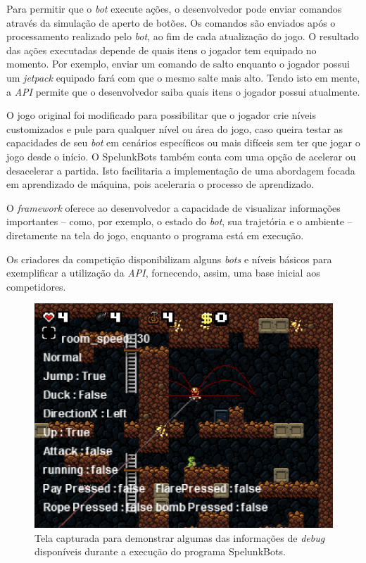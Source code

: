 Para permitir que o \textit{bot} execute ações, o desenvolvedor pode enviar
comandos através da simulação de aperto de botões. Os comandos são enviados
após o processamento realizado pelo \textit{bot}, ao fim de cada atualização do
jogo. O resultado das ações executadas depende de quais itens o jogador tem
equipado no momento. Por exemplo, enviar um comando de salto enquanto o jogador
possui um \textit{jetpack} equipado fará com que o mesmo salte mais alto. Tendo
isto em mente, a \textit{API} permite que o desenvolvedor saiba quais itens o
jogador possui atualmente.

O jogo original foi modificado para possibilitar que o jogador crie níveis
customizados e pule para qualquer nível ou área do jogo, caso queira testar as
capacidades de seu \textit{bot} em cenários específicos ou mais difíceis sem
ter que jogar o jogo desde o início. O SpelunkBots também conta com uma opção
de acelerar ou desacelerar a partida. Isto facilitaria a implementação de uma
abordagem focada em aprendizado de máquina, pois aceleraria o processo de
aprendizado.

O \textit{framework} oferece ao desenvolvedor a capacidade de visualizar
informações importantes -- como, por exemplo, o estado do \textit{bot}, sua
trajetória e o ambiente -- diretamente na tela do jogo, enquanto o programa
está em execução.

Os criadores da competição disponibilizam alguns \textit{bots} e níveis básicos
para exemplificar a utilização da \textit{API}, fornecendo, assim, uma base
inicial aos competidores.

\begin{figure}[htb!]
\centering\includegraphics[width=.65\textwidth]{fig/spelunkbots-debug-screen.png}
\caption {\label{fig:spelunkbots-debug-screen}Tela capturada para demonstrar
algumas das informações de \textit{debug} disponíveis durante a execução do
programa SpelunkBots.} \end{figure}


